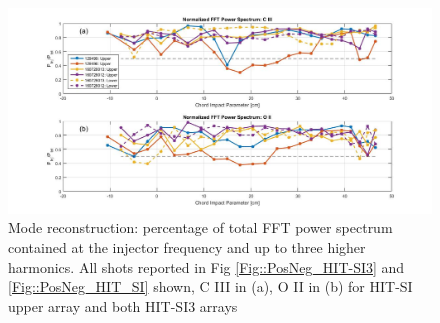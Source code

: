\begin{center}
\begin{figure}
\hspace*{-10ex}\includegraphics[width=8in]{FFT_3}\caption{Mode reconstruction: percentage of total FFT power spectrum contained at the injector frequency and up to three higher harmonics. All shots reported in Fig \ref{Fig::PosNeg_HIT-SI3} and \ref{Fig::PosNeg_HIT_SI} shown, C III in (a), O II in (b) for HIT-SI upper array and both HIT-SI3 arrays}\label{Fig::FFT Spect}
\end{figure}
\end{center}



